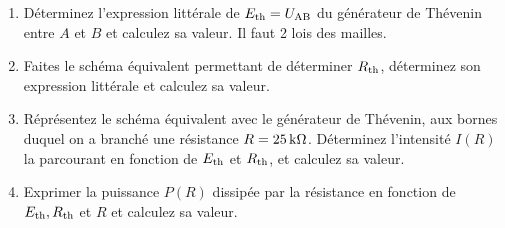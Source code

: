 \documentclass[10pt,a4paper]{article}
\begin{document}
\begin{enumerate}[label=\color{brandeisblue}\arabic*), resume]
    \item Déterminez l'expression littérale de $E _{\text{th}} = U _{\text{AB}}$ du
        générateur de Thévenin entre $A$ et $B$ et calculez sa valeur. Il faut 2
        lois des mailles.
        \vspace{3cm}
    \item Faites le schéma équivalent permettant de déterminer $R _{\text{th}}$,
        déterminez son expression littérale et calculez sa valeur.
        \vspace{3cm}
    \item Réprésentez le schéma équivalent avec le générateur de Thévenin,
        aux bornes duquel on a branché une résistance $R = \SI{25}{k\Omega}$.
        Déterminez l'intensité $I(R)$ la parcourant en fonction de $E _{\text{th}}$
        et $R _{\text{th}}$, et calculez sa valeur.
        \vspace{3cm}
    \item Exprimer la puissance $P(R)$ dissipée par la résistance en fonction de
        $E _{\text{th}}, R _{\text{th}}$ et $R$ et calculez sa valeur.
\end{enumerate}
\end{document}
